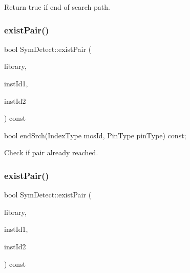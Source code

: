 Return true if end of search path. 

\mbox{\label{classSymDetect_a245b48760c705d4ad9b2bad39012030e}} 
\subsubsection{\texorpdfstring{exist\+Pair()}{existPair()}\hspace{0.1cm}{\footnotesize\ttfamily [1/2]}}
{\footnotesize\ttfamily bool Sym\+Detect\+::exist\+Pair (\begin{DoxyParamCaption}\item[{std\+::vector$<$ \hyperlink{structMosPair}{Mos\+Pair} $>$ \&}]{library,  }\item[{\hyperlink{type_8h_a581e8093e28e7362f2b6937296190676}{Index\+Type}}]{inst\+Id1,  }\item[{\hyperlink{type_8h_a581e8093e28e7362f2b6937296190676}{Index\+Type}}]{inst\+Id2 }\end{DoxyParamCaption}) const\hspace{0.3cm}{\ttfamily [private]}}



bool end\+Srch(\+Index\+Type mos\+Id, Pin\+Type pin\+Type) const; 

Check if pair already reached. \mbox{\label{classSymDetect_a821c77fb04532c8fb6a6f2f26c51bebf}} 
\subsubsection{\texorpdfstring{exist\+Pair()}{existPair()}\hspace{0.1cm}{\footnotesize\ttfamily [2/2]}}
{\footnotesize\ttfamily bool Sym\+Detect\+::exist\+Pair (\begin{DoxyParamCaption}\item[{std\+::vector$<$ \hyperlink{structSymDetect_1_1srchObj}{srch\+Obj} $>$ \&}]{library,  }\item[{\hyperlink{type_8h_a581e8093e28e7362f2b6937296190676}{Index\+Type}}]{inst\+Id1,  }\item[{\hyperlink{type_8h_a581e8093e28e7362f2b6937296190676}{Index\+Type}}]{inst\+Id2 }\end{DoxyParamCaption}) const\hspace{0.3cm}{\ttfamily [private]}}



